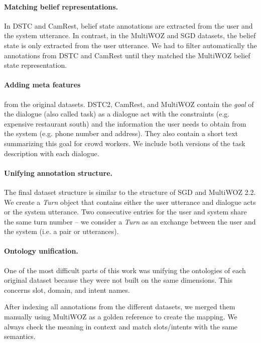 \paragraph{Matching belief representations.} In DSTC and CamRest, belief state annotations are extracted from the user and the system utterance.
In contrast, in the MultiWOZ and SGD datasets, the belief state is only extracted from the user utterance.
We had to filter automatically the annotations from DSTC and CamRest until they matched the MultiWOZ belief state representation. 
    
\paragraph{Adding meta features} from the original datasets. DSTC2, CamRest, and MultiWOZ contain the \emph{goal} of the dialogue (also called task) as a dialogue act with the constraints (e.g. expensive restaurant south) and the information the user needs to obtain from the system (e.g. phone number and address). They also contain a short text summarizing this goal for crowd workers. We include both versions of the task description with each dialogue.
    
\paragraph{Unifying annotation structure.} The final dataset structure is similar to the structure of SGD and MultiWOZ 2.2. We create a \textit{Turn} object that contains either the user utterance and dialogue acts or the system utterance.
Two consecutive entries for the user and system share the same turn number -- we consider a \textit{Turn} as an exchange between the user and the system (i.e. a pair or utterances). 

\paragraph{Ontology unification.}   
One of the most difficult parts of this work was unifying the ontologies of each original dataset because they were not built on the same dimensions.
This concerns slot, domain, and intent names.

After indexing all annotations from the different datasets, we merged them manually using MultiWOZ as a golden reference to create the mapping.
We always check the meaning in context and match slots/intents with the same semantics.


